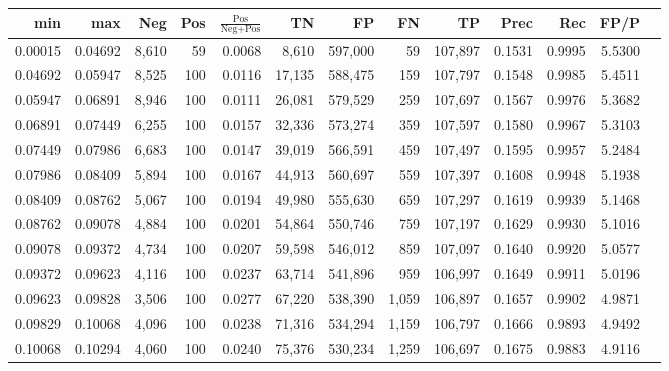 \begin{tabular}{rrrrrrrrrrrrr}
\toprule
    min &     max &   Neg & Pos & $\frac{\text{Pos}}{\text{Neg}+\text{Pos}}$ &      TN &      FP &      FN &      TP &   Prec &    Rec &   FP/P \\
\midrule
0.00015 & 0.04692 & 8,610 &  59 &                                     0.0068 &   8,610 & 597,000 &      59 & 107,897 & 0.1531 & 0.9995 & 5.5300 \\
0.04692 & 0.05947 & 8,525 & 100 &                                     0.0116 &  17,135 & 588,475 &     159 & 107,797 & 0.1548 & 0.9985 & 5.4511 \\
0.05947 & 0.06891 & 8,946 & 100 &                                     0.0111 &  26,081 & 579,529 &     259 & 107,697 & 0.1567 & 0.9976 & 5.3682 \\
0.06891 & 0.07449 & 6,255 & 100 &                                     0.0157 &  32,336 & 573,274 &     359 & 107,597 & 0.1580 & 0.9967 & 5.3103 \\
0.07449 & 0.07986 & 6,683 & 100 &                                     0.0147 &  39,019 & 566,591 &     459 & 107,497 & 0.1595 & 0.9957 & 5.2484 \\
0.07986 & 0.08409 & 5,894 & 100 &                                     0.0167 &  44,913 & 560,697 &     559 & 107,397 & 0.1608 & 0.9948 & 5.1938 \\
0.08409 & 0.08762 & 5,067 & 100 &                                     0.0194 &  49,980 & 555,630 &     659 & 107,297 & 0.1619 & 0.9939 & 5.1468 \\
0.08762 & 0.09078 & 4,884 & 100 &                                     0.0201 &  54,864 & 550,746 &     759 & 107,197 & 0.1629 & 0.9930 & 5.1016 \\
0.09078 & 0.09372 & 4,734 & 100 &                                     0.0207 &  59,598 & 546,012 &     859 & 107,097 & 0.1640 & 0.9920 & 5.0577 \\
0.09372 & 0.09623 & 4,116 & 100 &                                     0.0237 &  63,714 & 541,896 &     959 & 106,997 & 0.1649 & 0.9911 & 5.0196 \\
0.09623 & 0.09828 & 3,506 & 100 &                                     0.0277 &  67,220 & 538,390 &   1,059 & 106,897 & 0.1657 & 0.9902 & 4.9871 \\
0.09829 & 0.10068 & 4,096 & 100 &                                     0.0238 &  71,316 & 534,294 &   1,159 & 106,797 & 0.1666 & 0.9893 & 4.9492 \\
0.10068 & 0.10294 & 4,060 & 100 &                                     0.0240 &  75,376 & 530,234 &   1,259 & 106,697 & 0.1675 & 0.9883 & 4.9116 \\

\end{tabular}
